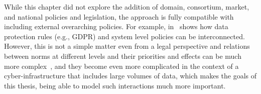 While this chapter did not explore the addition of domain, consortium, market, and national policies and legislation, the approach is fully compatible with including external overarching policies. For example, in~\cite{binsbergen2021b} shows how data protection rules (e.g., GDPR) and system level policies can be interconnected. However, this is not a simple matter even from a legal perspective and relations between norms at different levels and their priorities and effects can be much more complex~\cite{hart2012concept}, and they become even more complicated in the context of a cyber-infrastructure that includes large volumes of data, which makes the goals of this thesis, being able to model such interactions much more important.